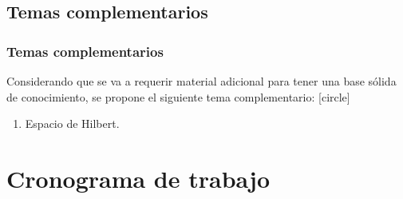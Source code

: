 \documentclass[12pt]{beamer}
\begin{document}



\subsection{Temas complementarios}

\begin{frame}
\frametitle{Temas complementarios}
Considerando que se va a requerir material adicional para tener una base sólida de conocimiento, se propone el siguiente tema complementario:
[circle]
\begin{enumerate}[<+->]
\item Espacio de Hilbert.
\end{enumerate}
\end{frame}

\section{Cronograma de trabajo}
\end{document}
